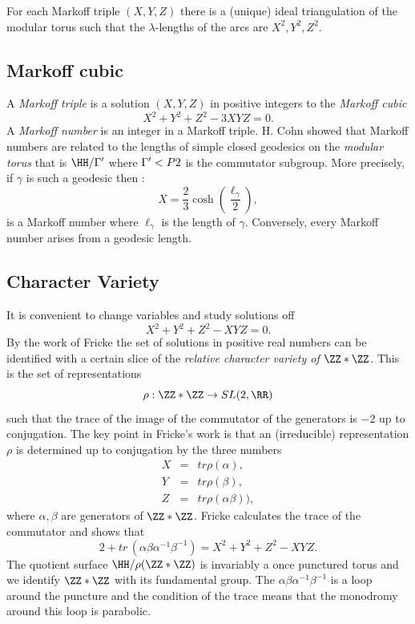 \begin{thm}
For each  Markoff triple $(X,Y,Z)$
there is a (unique) ideal triangulation of the modular torus
such that the $\lambda$-lengths of the arcs are 
$X^2,Y^2,Z^2$.
\end{thm}

\subsection{Markoff cubic}

A \textit{Markoff triple} is a  solution $(X,Y,Z)$  in positive integers to
the \textit{Markoff cubic}
\begin{equation}\label{m cubic}
X^2 + Y^2 + Z^2 - 3XYZ = 0.
\end{equation}
A \textit{Markoff number} is an integer in a Markoff triple.
H. Cohn showed that Markoff numbers are related to the 
lengths of simple closed geodesics on the \textit{modular torus}
that is $\HH/\Gamma'$ 
where $\Gamma' < P\sl2$ is the commutator subgroup.
More precisely, if $\gamma$ is such a geodesic then :
\begin{equation}
X  = \frac{2}{3} \cosh \left( \frac{\ell_\gamma}{2}\right),
\end{equation}
is a Markoff number where $\ell_\gamma$ is the length of $\gamma$.
Conversely, every Markoff number arises from a geodesic length.

\subsection{Character Variety}

It is convenient to change variables and study solutions off
\begin{equation}\label{f cubic}
X^2 + Y^2 + Z^2 - XYZ = 0.
\end{equation}
By the work of Fricke the set of solutions in positive real numbers
can be identified with a certain slice of the 
\textit{relative character variety of $\ZZ * \ZZ$}.
This is the set of  representations 
$$\rho: \ZZ * \ZZ \rightarrow SL(2, \RR)$$
such that the trace of the image of the commutator of the generators is $-2$
up to conjugation.
The key point in Fricke's work is that an (irreducible) representation $\rho$
is determined up to conjugation by the three numbers
\begin{eqnarray*}
X &= &tr \rho(\alpha), \\
Y  &= &tr \rho(\beta), \\
Z &= & tr \rho(\alpha\beta)),
\end{eqnarray*}
where $\alpha,\beta$ are generators of $\ZZ*\ZZ$.
Fricke calculates the trace of the commutator and shows that
\begin{equation}
2 + tr\,  (\alpha\beta\alpha^{-1}\beta^{-1}) = X^2 + Y^2 + Z^2 - XYZ .
\end{equation}
The quotient surface $\HH/\rho(\ZZ*\ZZ)$ is invariably a once punctured torus
and we identify $\ZZ * \ZZ$ with its fundamental group.
The $\alpha\beta\alpha^{-1}\beta^{-1}$ is a loop around the puncture
and the condition of the trace means that the monodromy around this loop is parabolic.


